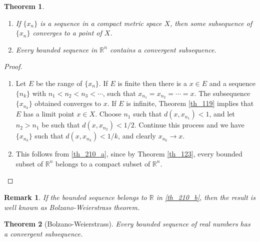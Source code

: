 \documentclass[11pt]{book}
\newtheorem{theorem}{Theorem}[chapter]
\newtheorem{remark}{Remark}[chapter]
\theoremstyle{definition}
\numberwithin{equation}{chapter}
\begin{document}
\begin{theorem}\label{th_210}
~\begin{enumerate}[label=(\alph*)]
    \item If $\{x_n\}$ is a sequence in a compact metric space $X$, then some subsequence of $\{x_n\}$ converges to a point of $X$. \label{th_210_a}
    
    \item Every bounded sequence in $\mathbb{R}^n$ contains a convergent subsequence. \label{th_210_b}
\end{enumerate}
\end{theorem}
\begin{proof}
~\begin{enumerate}[label=(\alph*)]
    \item Let $E$ be the range of $\{x_n\}$. If $E$ is finite then there is a $x \in E$ and a sequence $\{n_k\}$ with $n_1 < n_2 < n_3 < \cdots$, such that $x_{n_1} = x_{n_2} = \cdots = x$. The subsequence $\{x_{n_k}\}$ obtained converges to $x$. If $E$ is infinite, Theorem \ref{th_119} implies that $E$ has a limit point $x \in X$. Choose $n_1$ such that $d(x,x_{n_1}) < 1$, and let $n_2 > n_1$ be such that $d(x,x_{n_2}) < 1/2$. Continue this process and we have $\{x_{n_k}\}$ such that $d(x,x_{n_k}) < 1/k$, and clearly $x_{n_k} \to x$.
    
    \item This follows from \ref{th_210_a}, since by Theorem \ref{th_123}, every bounded subset of $\mathbb{R}^n$ belongs to a compact subset of $\mathbb{R}^n$.
\end{enumerate}
\end{proof}

\begin{remark}
If the bounded sequence belongs to $\mathbb{R}$ in \ref{th_210_b}, then the result is well known as Bolzano-Weierstrass theorem.
\end{remark}

\medskip

\begin{theorem}[Bolzano-Weierstrass]
Every bounded sequence of real numbers has a convergent subsequence.
\end{theorem}

\medskip
\end{document}
